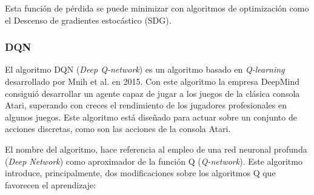 Esta función de pérdida se puede minimizar con algoritmos de optimización como el Descenso de gradientes estocástico (SDG).

\subsubsection{DQN}

El algoritmo DQN (\textit{Deep Q-network}) es un algoritmo basado en \textit{Q-learning} desarrollado por Mnih et al.  en 2015. Con este algoritmo la empresa DeepMind consiguió desarrollar un agente capaz de jugar a los juegos de la clásica consola Atari, superando con creces el rendimiento de los jugadores profesionales en algunos juegos. Este algoritmo está diseñado para actuar sobre un conjunto de acciones discretas, como son las acciones de la consola Atari.

El nombre del algoritmo, hace referencia al empleo de una red neuronal profunda (\textit{Deep Network}) como aproximador de la función Q (\textit{Q-network}).
Este algoritmo introduce, principalmente, dos modificaciones sobre los algoritmos Q que favorecen el aprendizaje:

